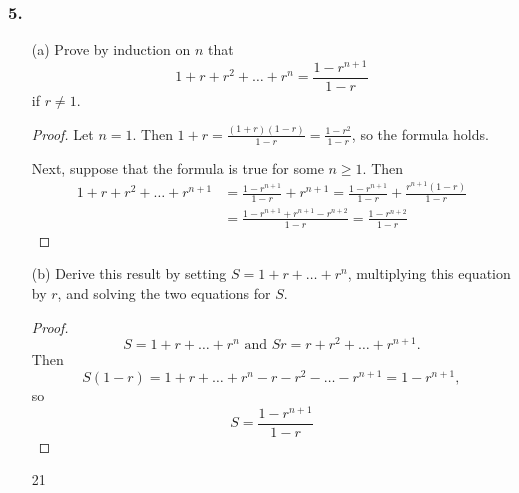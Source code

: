 \documentclass{article}
\begin{document}
\subsubsection*{5.}
\begin{enumerate}
	\item[(a)] Prove by induction on $n$ that \[ 1 + r + r^2 + \dots + r^n = \frac{1 - r^{n+1}}{1 - r} \] if $r \ne 1$.
	\begin{proof}
		Let $n = 1$. Then $1 + r = \frac{(1 + r)(1 - r)}{1 - r} = \frac{1 - r^2}{1 - r}$, so the formula holds.

		Next, suppose that the formula is true for some $n \ge 1$. Then
		\begin{align*}
			1 + r + r^2 + \dots + r^{n+1} &= \frac{1 - r^{n+1}}{1-r} + r^{n+1} = \frac{1 - r^{n+1}}{1-r} + \frac{r^{n+1}(1 - r)}{1 - r} \\&= \frac{1 - r^{n+1} + r^{n+1} - r^{n+2}}{1 - r} = \frac{1 - r^{n + 2}}{1 - r}
		\end{align*}
	\end{proof}
	\item[(b)] Derive this result by setting $S = 1 + r + \dots + r^n$, multiplying this equation by $r$, and solving the two equations for $S$.
	\begin{proof}
		\[ S = 1 + r + \dots + r^n \text{ and } Sr = r + r^2 + \dots + r^{n+1}. \] Then \[ S(1 - r) = 1 + r + \dots + r^n - r - r^2 - \dots - r^{n+1} = 1 - r^{n+1}, \] so \[ S = \frac{1 - r^{n+1}}{1 - r} \]
	\end{proof}21
\end{enumerate} 
\end{document}
